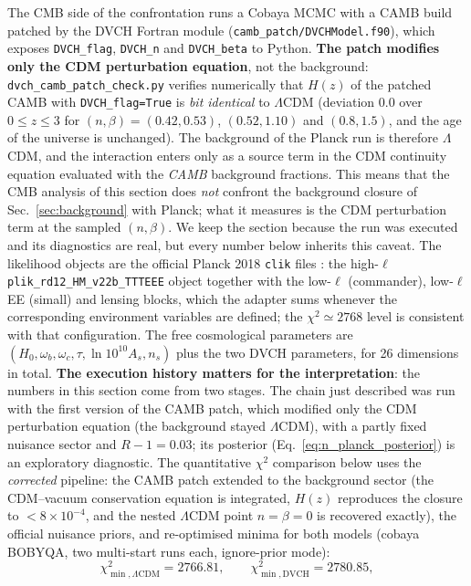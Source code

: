 \documentclass[pdflatex,sn-mathphys-num]{sn-jnl}%
\begin{document}
The CMB side of the confrontation runs a Cobaya MCMC
\cite{Torrado:2020dgo} with a CAMB build patched by the DVCH Fortran module
(\texttt{camb\_patch/DVCHModel.f90}), which exposes
\texttt{DVCH\_flag}, \texttt{DVCH\_n} and \texttt{DVCH\_beta} to Python.
\textbf{The patch modifies only the CDM perturbation equation}, not the
background: \texttt{dvch\_camb\_patch\_check.py} verifies numerically that
$H(z)$ of the patched CAMB with \texttt{DVCH\_flag=True} is \emph{bit
identical} to $\Lambda$CDM (deviation $0.0$ over $0\le z\le3$ for
$(n,\beta)=(0.42,0.53)$, $(0.52,1.10)$ and $(0.8,1.5)$, and the age of the
universe is unchanged). The background of the Planck run is therefore
$\Lambda$CDM, and the interaction enters only as a source term in the CDM
continuity equation evaluated with the \emph{CAMB} background fractions.
This means that the CMB analysis of this section does \emph{not} confront
the background closure of Sec.~\ref{sec:background} with Planck; what it
measures is the CDM perturbation term at the sampled $(n,\beta)$. We keep
the section because the run was executed and its diagnostics are real, but
every number below inherits this caveat. The likelihood objects are the
official Planck 2018 \texttt{clik} files \cite{Planck:2019nip}: the
high-$\ell$ \texttt{plik\_rd12\_HM\_v22b\_TTTEEE} object together with the
low-$\ell$ (commander), low-$\ell$ EE (simall) and lensing blocks, which
the adapter sums whenever the corresponding environment variables are
defined; the $\chi^2\simeq2768$ level is consistent with that
configuration. The free cosmological
parameters are $(H_0,\omega_b,\omega_c,\tau,\ln10^{10}A_s,n_s)$ plus the two
DVCH parameters, for 26 dimensions in total.
\textbf{The execution history matters for the interpretation}: the numbers
in this section come from two stages. The chain just described was run with
the first version of the CAMB patch, which modified only the CDM
perturbation equation (the background stayed $\Lambda$CDM), with a partly
fixed nuisance sector and $R-1=0.03$; its posterior
(Eq.~\ref{eq:n_planck_posterior}) is an exploratory diagnostic. The
quantitative $\chi^2$ comparison below uses the \emph{corrected} pipeline:
the CAMB patch extended to the background sector (the CDM--vacuum
conservation equation is integrated, $H(z)$ reproduces the closure to
$<8\times10^{-4}$, and the nested $\Lambda$CDM point $n=\beta=0$ is
recovered exactly), the official nuisance priors, and re-optimised minima
for both models (cobaya BOBYQA, two multi-start runs each, ignore-prior
mode):
\begin{equation}
\chi^2_{\min,\Lambda\mathrm{CDM}} = 2766.81,\qquad
\chi^2_{\min,\mathrm{DVCH}} = 2780.85,
\label{eq:chi2_planck}
\end{equation}
\end{document}
